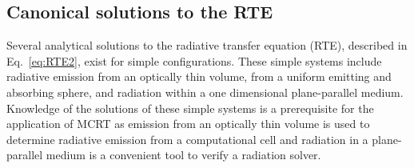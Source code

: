 \subsection{Canonical solutions to the RTE}\label{section:SolutionsToRTE}
Several analytical solutions to the radiative transfer equation (RTE), described in Eq.~\ref{eq:RTE2}, exist for simple configurations. These simple systems include radiative emission from an optically thin volume, from a uniform emitting and absorbing sphere, and radiation within a one dimensional plane-parallel medium. 
Knowledge of the solutions of these simple systems is a prerequisite for the application of MCRT as emission from an optically thin volume is used to determine radiative emission from a computational cell and radiation in a plane-parallel medium is a convenient tool to verify a radiation solver.

